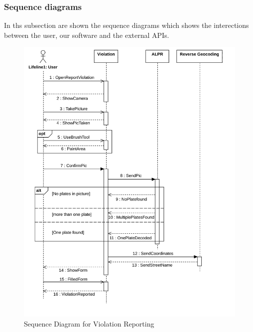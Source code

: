\subsubsection{Sequence diagrams}
In ths subsection are shown the sequence diagrams which shows the interections between the user, our software and the external APIs.

\begin{figure}[H]
   \centering
     \includegraphics[width=\textwidth]{Images/SequenceViolation.png}
     \caption{Sequence Diagram for Violation Reporting}   \label{fig:sequenceViolation}
\end{figure}

